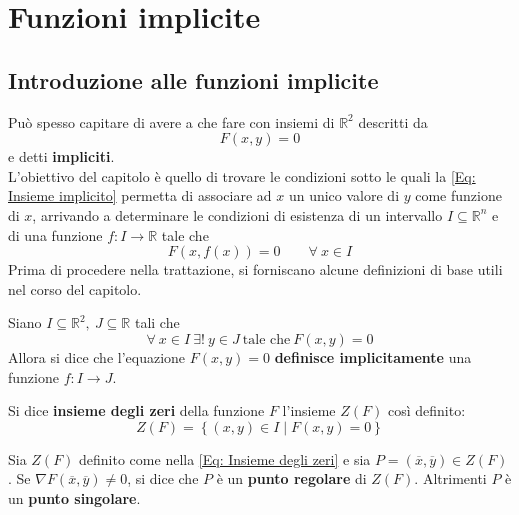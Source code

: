 \chapter{Funzioni implicite}
\section{Introduzione alle funzioni implicite}
Può spesso capitare di avere a che fare con insiemi di $\mathbb{R}^2$ descritti da
\begin{equation} \label{Eq: Insieme implicito}
    F(x,y)=0 
\end{equation}
e detti \textbf{impliciti}.\\
L'obiettivo del capitolo è quello di trovare le condizioni sotto le quali la \eqref{Eq: Insieme implicito} permetta di associare ad $x$ un unico valore di $y$ come funzione di $x$,  arrivando a determinare le condizioni di esistenza di un intervallo $I \subseteq \mathbb{R}^n$ e di una funzione $f: I \to \mathbb{R}$ tale che
\begin{equation} \label{Eq: Scopo capitolo 3}
    F(x, f(x))=0 \qquad \forall\ x \in I
\end{equation}
Prima di procedere nella trattazione, si forniscano alcune definizioni di base utili nel corso del capitolo.
\begin{definition} \label{Def: Funzione implicita}
    Siano $I \subseteq \mathbb{R}^2,\ J \subseteq \mathbb{R}$ tali che
    \begin{equation}
        \forall\ x\in I\ \exists!\ y \in J\ \text{tale che}\ F(x,y)=0
    \end{equation}
    Allora si dice che l'equazione $F(x,y)=0$ \textbf{definisce implicitamente} una funzione $f: I \to J$.
\end{definition}
\begin{definition} \label{Def: Insieme degli zeri}
    Si dice \textbf{insieme degli zeri} della funzione $F$ l'insieme $Z(F)$ così definito:
    \begin{equation} \label{Eq: Insieme degli zeri}
        Z(F)=\left\{(x,y) \in I \mid F(x, y)=0 \right\}
    \end{equation}
\end{definition}
\begin{definition}
    Sia $Z(F)$ definito come nella \eqref{Eq: Insieme degli zeri} e sia $P=(\overline{x}, \overline{y}) \in Z(F)$. Se $\nabla F(\overline{x}, \overline{y})\neq 0$, si dice che $P$ è un \textbf{punto regolare} di $Z(F)$. Altrimenti $P$ è un \textbf{punto singolare}.
\end{definition}
